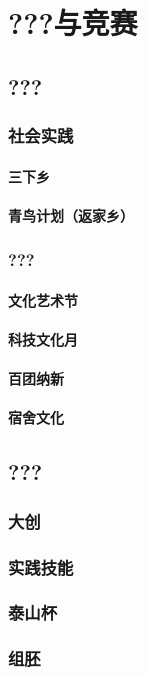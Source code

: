 \chapter[???与竞赛]{???与竞赛}
\section[???]{???}
\subsection[社会实践]{社会实践}
\subsubsection[三下乡]{三下乡}
\subsubsection[青鸟计划（返家乡）]{青鸟计划（返家乡）}
\subsection[???]{???}
\subsubsection[文化艺术节]{文化艺术节}
\subsubsection[科技文化月]{科技文化月}
\subsubsection[百团纳新]{百团纳新}
\subsubsection[宿舍文化]{宿舍文化}
\section[竞赛]{???}
\subsection[大创]{大创}
\subsection[实践技能]{实践技能}
\subsection[泰山杯]{泰山杯}
\subsection[组胚]{组胚}

